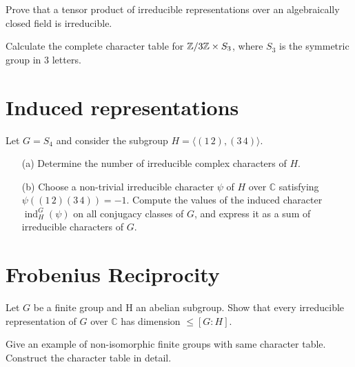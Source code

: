 \begin{prob}[S2015-Q5]
    Prove that a tensor product of irreducible representations over an algebraically closed field is irreducible.
\end{prob}

\begin{prob}[S2001-Q3]
    Calculate the complete character table for $\mathbb{Z}/3\mathbb{Z}\times S_3$, where $S_3$ is the symmetric group in 3 letters.
\end{prob}

\section{Induced representations}


\begin{prob}[S2009-Q6]
    Let \( G = S_4 \) and consider the subgroup \( H = \langle (1\,2), (3\,4) \rangle \).
    
    \begin{enumerate}
        \item[(a)] Determine the number of irreducible complex characters of \( H \).
        
        \item[(b)] Choose a non-trivial irreducible character \( \psi \) of \( H \) over \( \mathbb{C} \) satisfying \( \psi((1\,2)(3\,4)) = -1 \). Compute the values of the induced character \( \operatorname{ind}_H^G(\psi) \) on all conjugacy classes of \( G \), and express it as a sum of irreducible characters of \( G \).
    \end{enumerate}
\end{prob}

\section{Frobenius Reciprocity}

\begin{prob}[S2017-Q6]
    Let $G$ be a finite group and H an abelian subgroup. Show that every
    irreducible representation of $G$ over $\mathbb{C}$ has dimension 
    $\leq[G : H]$.
\end{prob}

\begin{prob}[S2008-Q6]
    Give an example of non-isomorphic finite groups with same character
table. Construct the character table in detail.
\end{prob}

